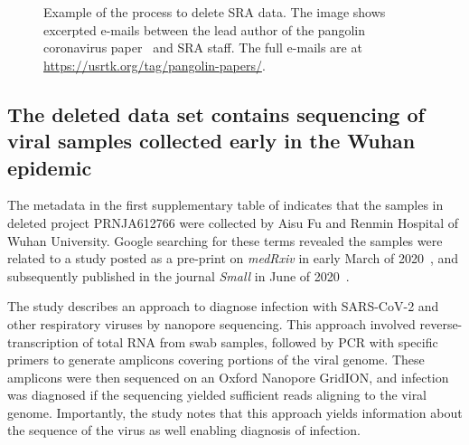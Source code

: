 \documentclass[9pt,twocolumn,twoside]{gsajnl_modified}
\begin{document}
\begin{figure}[]
\centering
{}
\caption{Example of the process to delete SRA data.
The image shows excerpted e-mails between the lead author of the pangolin coronavirus paper~\citet{xiao2020isolation} and SRA staff.
The full e-mails are at \url{https://usrtk.org/tag/pangolin-papers/}.
}
\label{fig:pangolin_emails}
\end{figure}

\subsection{The deleted data set contains sequencing of viral samples collected early in the Wuhan epidemic}
The metadata in the first supplementary table of \citet{farkas2020insights} indicates that the samples in deleted project PRNJA612766 were collected by Aisu Fu and Renmin Hospital of Wuhan University.
Google searching for these terms revealed the samples were related to a study posted as a pre-print on \textit{medRxiv} in early March of 2020~\citep{wang2020medRxiv}, and subsequently published in the journal \textit{Small} in June of 2020~\citep{wang2020small}.

The study describes an approach to diagnose infection with SARS-CoV-2 and other respiratory viruses by nanopore sequencing.
This approach involved reverse-transcription of total RNA from swab samples, followed by PCR with specific primers to generate amplicons covering portions of the viral genome.
These amplicons were then sequenced on an Oxford Nanopore GridION, and infection was diagnosed if the sequencing yielded sufficient reads aligning to the viral genome.
Importantly, the study notes that this approach yields information about the sequence of the virus as well enabling diagnosis of infection.
\end{document}
